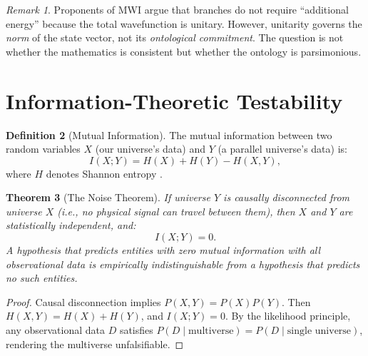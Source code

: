 \documentclass[12pt, a4paper]{article}
\theoremstyle{plain}
\newtheorem{theorem}{Theorem}[section]
\theoremstyle{definition}
\newtheorem{definition}[theorem]{Definition}
\theoremstyle{remark}
\newtheorem{remark}[theorem]{Remark}
\begin{document}
\begin{remark}
  Proponents of MWI argue that branches do not require ``additional
  energy'' because the total wavefunction is unitary. However, unitarity
  governs the \emph{norm} of the state vector, not its \emph{ontological
  commitment}. The question is not whether the mathematics is consistent
  but whether the ontology is parsimonious.
\end{remark}

\section{Information-Theoretic Testability}\label{sec:testability}

\begin{definition}[Mutual Information]\label{def:mi}
  The mutual information between two random variables $X$ (our universe's
  data) and $Y$ (a parallel universe's data) is:
  \begin{equation}
    I(X; Y) = H(X) + H(Y) - H(X, Y),
  \end{equation}
  where $H$ denotes Shannon entropy \citep{Shannon1948, Cover2006}.
\end{definition}

\begin{theorem}[The Noise Theorem]\label{thm:noise}
  If universe $Y$ is causally disconnected from universe $X$ (i.e., no
  physical signal can travel between them), then $X$ and $Y$ are
  statistically independent, and:
  \begin{equation}
    I(X; Y) = 0.
  \end{equation}
  A hypothesis that predicts entities with zero mutual information with
  all observational data is empirically indistinguishable from a
  hypothesis that predicts no such entities.
\end{theorem}

\begin{proof}
  Causal disconnection implies $P(X, Y) = P(X) P(Y)$. Then
  $H(X, Y) = H(X) + H(Y)$, and $I(X; Y) = 0$. By the likelihood
  principle, any observational data $D$ satisfies
  $P(D \mid \text{multiverse}) = P(D \mid \text{single universe})$,
  rendering the multiverse unfalsifiable. \qedhere
\end{proof}

\end{document}
